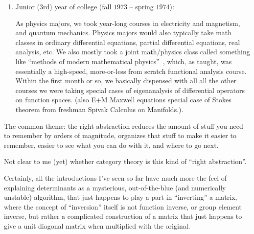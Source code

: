 \documentclass[11pt]{book}
\begin{document}
\begin{enumerate}
  \item Junior ($3$rd) year of college 
  (fall $1973$ -- spring $1974$):
  \par
  As physics majors, we took year-long courses in 
  electricity and magnetism, and quantum mechanics.
  Physics majors would also typically take math classes in
  ordinary differential equations, partial differential equations,
  real analysis, etc. We also mostly took a joint math/physics
  class called something like ``methods of modern mathematical 
  physics''~\cite{reed_simon_1972_functional_analysis}, 
  which, as taught, was essentially a high-speed,
  more-or-less from scratch functional analysis course.
  Within the first month or so, we basically dispensed with all
  all the other courses we were taking special cases of 
  eigenanalysis of differential operators on function spaces.
  (also E+M Maxwell equations special case of Stokes theorem 
  from freshman Spivak Calculus on Manifolds.).
  
\end{enumerate}

The common theme: the right abstraction reduces 
the amount of stuff you need to remember by orders of magnitude,
organizes that stuff to make it easier to remember,
easier to see what you can do with it,
and where to go next.

Not clear to me (yet) whether category theory is this kind of
``right abstraction''. 

Certainly, all the introductions I've seen so far have much more
the feel of explaining determinants as a mysterious,
out-of-the-blue (and numerically unstable) algorithm,
that just happens to play a part in ``inverting'' a matrix,
where the concept of ``inversion'' itself is not 
function inverse, or group element inverse,
but rather a complicated construction of a matrix that
just happens to give a unit diagonal matrix when multiplied with 
the original.

\setcounter{currentlevel}{\value{baseSectionLevel}}
\label{sec:Why?}

\setlength{\epigraphwidth}{0.95\linewidth}
\end{document}
